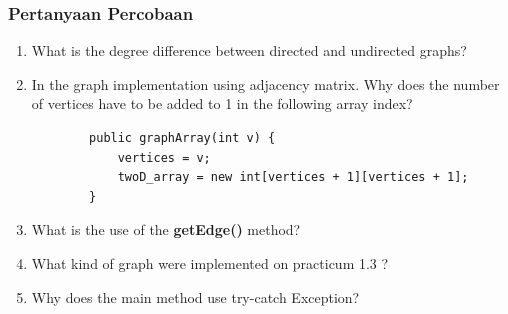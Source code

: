 \documentclass[12pt,titlepage]{article}
\begin{document}
\subsubsection{Pertanyaan Percobaan}
\begin{enumerate}
    \item What is the degree difference between directed and undirected graphs?
    \item In the graph implementation using adjacency matrix. Why does the number of vertices have to be added to 1 in the following array index?
    \begin{verbatim}
        public graphArray(int v) {
            vertices = v;
            twoD_array = new int[vertices + 1][vertices + 1];
        }
    \end{verbatim}
    \item What is the use of the \textbf{getEdge()} method?
    \item What kind of graph were implemented on practicum 1.3 ?
    \item Why does the main method use try-catch Exception?
\end{enumerate}
\end{document}
